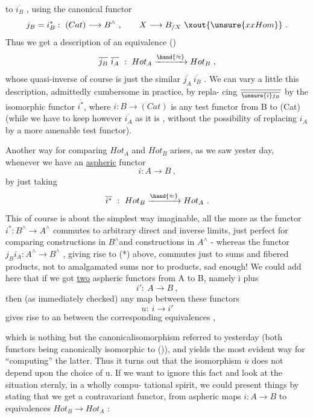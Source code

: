 to $\overline{i_{B}}$ , using the  canonical functor
\[ j_B = i_B^{*} : \ (Cat) \longrightarrow B^{\wedge} \ , \qquad X \longrightarrow B_{/X} \ \xout{\unsure{xxHom}} \ . \]
Thus we get a description of an equivalence
() \[ \overline{j_B}\ \overline{i_A} \ : \ Hot_A \xrightarrow{\hand{\approx}} Hot_B \ , \]
whose quasi-inverse of course is just the similar $\overline{j_A}\ \overline{i_B}$ . We can vary
a little this description, admittedly cumbersome in practice, by repla-%
cing $\overline{\over{\unsure{i}}{j}_{B}}$ by the isomorphic functor $\overline{i^{*}}$, where $i : B \to (Cat)$ is
any test functor from B to (Cat) (while we have to keep however $\overline{i_A}$ as it
is , without the possibility of replacing $i_A$ by a more amenable test
functor).

Another way for comparing $Hot_A$ and $Hot_B$ arises, as we saw yester%
day, whenever we have an \uline{aspheric} functor
 \[ i : A \longrightarrow B \ , \]
by just taking
 \[ \overline{i^{*}} \ : \ Hot_B \xrightarrow{\hand{\approx}} Hot_A \ . \]
This of course is about the  simplest way imaginable, all the more
as the functor $i^{*} : B^{\wedge} \to A^{\wedge}$ commutes to arbitrary direct and inverse
limits, just perfect for comparing constructions in $B^{\wedge}$and constructions
in $A^{\wedge}$ - whereas the functor $j_B i_A : A^{\wedge} \longrightarrow B^{\wedge}$ , giving rise to (*) above,
commutes just to sums and fibered products, not to amalgamated sums nor
to products, sad enough! We could add here that if we got \uline{two}
aspheric functors from A to B, namely i plus
\[ i' : \ A \longrightarrow B \ , \]
then (as immediately checked) any map between these functors
\[ u : \ i \longrightarrow i' \]
gives rise to an  between the corresponding equivalences
 ,

which is nothing but the canonicalisomorphism referred to yesterday
\margin{(*)} (both functors being canonically isomorphic to ()), and yields the
most evident way for ``computing'' the latter. Thus it turns out that
the isomorphism $\overline{u}$ does not depend upon the choice of u. If we want
to ignore this fact and look at the situation sternly, in a wholly compu-%
tational spirit, we could present things by stating that we get a
contravariant functor, from aspheric maps $i: A \to B$ to equivalences
$Hot_B \to Hot_A$ :
